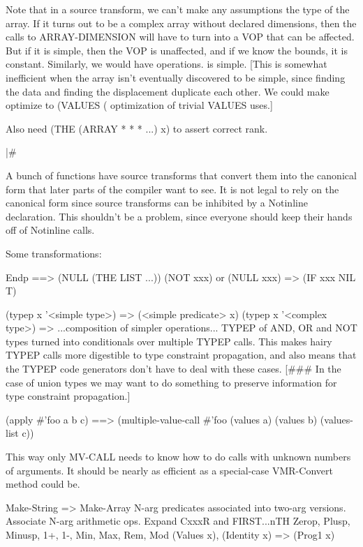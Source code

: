 Note that in a source transform, we can't make any assumptions the type of the
array.  If it turns out to be a complex array without declared dimensions, then
the calls to ARRAY-DIMENSION will have to turn into a VOP that can be affected.
But if it is simple, then the VOP is unaffected, and if we know the bounds, it
is constant.  Similarly, we would have %
operations.  %
is simple.  [This is somewhat inefficient when the array isn't eventually
discovered to be simple, since finding the data and finding the displacement
duplicate each other.  We could make %
optimize to (VALUES (%
optimization of trivial VALUES uses.]

Also need (THE (ARRAY * * * ...) x) to assert correct rank.

|\#

A bunch of functions have source transforms that convert them into the
canonical form that later parts of the compiler want to see.  It is not legal
to rely on the canonical form since source transforms can be inhibited by a
Notinline declaration.  This shouldn't be a problem, since everyone should keep
their hands off of Notinline calls.

Some transformations:

Endp  ==>  (NULL (THE LIST ...))
(NOT xxx) or (NULL xxx) => (IF xxx NIL T)

(typep x '<simple type>) => (<simple predicate> x)
(typep x '<complex type>) => ...composition of simpler operations...
TYPEP of AND, OR and NOT types turned into conditionals over multiple TYPEP
calls.  This makes hairy TYPEP calls more digestible to type constraint
propagation, and also means that the TYPEP code generators don't have to deal
with these cases.  [\#\#\# In the case of union types we may want to do something
to preserve information for type constraint propagation.]


    (apply \#'foo a b c)
==>
    (multiple-value-call \#'foo (values a) (values b) (values-list c))

This way only MV-CALL needs to know how to do calls with unknown numbers of
arguments.  It should be nearly as efficient as a special-case VMR-Convert
method could be.


Make-String => Make-Array
N-arg predicates associated into two-arg versions.
Associate N-arg arithmetic ops.
Expand CxxxR and FIRST...nTH
Zerop, Plusp, Minusp, 1+, 1-, Min, Max, Rem, Mod
(Values x), (Identity x) => (Prog1 x)

